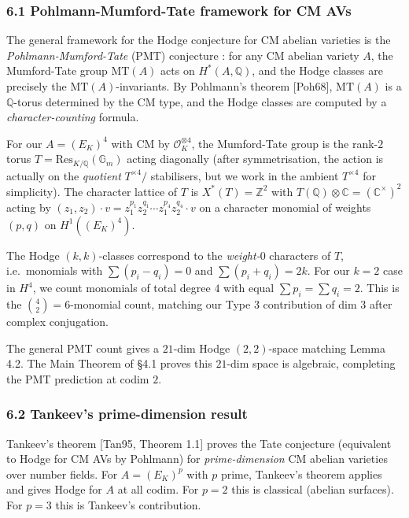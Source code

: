 \documentclass[
  11pt,
  a4paper,
]{amsart}
\begin{document}
\hypertarget{pohlmann-mumford-tate-framework-for-cm-avs}{%
\subsubsection{6.1 Pohlmann-Mumford-Tate framework for CM AVs}\label{pohlmann-mumford-tate-framework-for-cm-avs}}

The general framework for the Hodge conjecture for CM abelian varieties is the \emph{Pohlmann-Mumford-Tate} (PMT) conjecture : for any CM abelian variety \(A\), the Mumford-Tate group \(\mathrm{MT}(A)\) acts on \(H^*(A, \mathbb{Q})\), and the Hodge classes are precisely the \(\mathrm{MT}(A)\)-invariants. By Pohlmann's theorem {[}Poh68{]}, \(\mathrm{MT}(A)\) is a \(\mathbb{Q}\)-torus determined by the CM type, and the Hodge classes are computed by a \emph{character-counting} formula.

For our \(A = (E_K)^4\) with CM by \(\mathcal{O}_K^{\otimes 4}\), the Mumford-Tate group is the rank-\(2\) torus \(T = \mathrm{Res}_{K/\mathbb{Q}}(\mathbb{G}_m)\) acting diagonally (after symmetrisation, the action is actually on the \emph{quotient} \(T^{\times 4} /\) stabilisers, but we work in the ambient \(T^{\times 4}\) for simplicity). The character lattice of \(T\) is \(X^*(T) = \mathbb{Z}^2\) with \(T(\mathbb{Q}) \otimes \mathbb{C} = (\mathbb{C}^\times)^2\) acting by \((z_1, z_2) \cdot v = z_1^{p_1} z_2^{q_1} \cdots z_1^{p_4} z_2^{q_4} \cdot v\) on a character monomial of weights \((p, q)\) on \(H^1((E_K)^4)\).

The Hodge \((k, k)\)-classes correspond to the \emph{weight-\(0\)} characters of \(T\), i.e.~monomials with \(\sum (p_i - q_i) = 0\) and \(\sum (p_i + q_i) = 2k\). For our \(k = 2\) case in \(H^4\), we count monomials of total degree \(4\) with equal \(\sum p_i = \sum q_i = 2\). This is the \(\binom{4}{2} = 6\)-monomial count, matching our Type 3 contribution of dim \(3\) after complex conjugation.

The general PMT count gives a \(21\)-dim Hodge \((2, 2)\)-space matching Lemma 4.2. The Main Theorem of §4.1 proves this \(21\)-dim space is algebraic, completing the PMT prediction at codim \(2\).

\hypertarget{tankeevs-prime-dimension-result}{%
\subsubsection{6.2 Tankeev's prime-dimension result}\label{tankeevs-prime-dimension-result}}

Tankeev's theorem {[}Tan95, Theorem 1.1{]} proves the Tate conjecture (equivalent to Hodge for CM AVs by Pohlmann) for \emph{prime-dimension} CM abelian varieties over number fields. For \(A = (E_K)^p\) with \(p\) prime, Tankeev's theorem applies and gives Hodge for \(A\) at all codim. For \(p = 2\) this is classical (abelian surfaces). For \(p = 3\) this is Tankeev's contribution.
\end{document}

